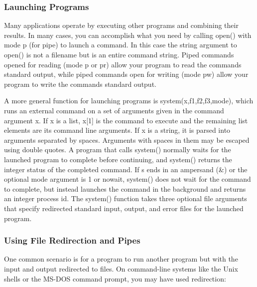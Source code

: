 \subsubsection[Launching Programs]{Launching Programs}

Many applications operate by executing other programs and combining
their results. In many cases, you can accomplish what you need by
calling \textsf{open()} with mode
\textsf{{\textquotedbl}p{\textquotedbl}} (for pipe) to
launch a command. In this case the string argument to \textsf{open()}
is not a filename but is an entire command string. Piped commands
opened for reading (mode \textsf{{\textquotedbl}p{\textquotedbl}} or
\textsf{{\textquotedbl}pr{\textquotedbl}}) allow your program to read
the command{\textquotesingle}s standard output, while piped commands
open for writing (mode \textsf{{\textquotedbl}pw{\textquotedbl}}) allow
your program to write the command{\textquotesingle}s standard output.

A more general function for launching programs is
\textsf{system(x,f1,f2,f3,mode)}, which runs an external command on a
set of arguments given in the command argument \textsf{x}. If
\textsf{x} is a list, \textsf{x[1]} is the command to execute and the
remaining list elements are its command line arguments. If \textsf{x}
is a string, it is parsed into arguments separated by spaces. Arguments
with spaces in them may be escaped using double quotes. A program that
calls \textsf{system()} normally waits for the launched
program to complete before continuing, and \textsf{system()} returns
the integer status of the completed command. If \textsf{s} ends in an
ampersand (\textsf{\&}) or the optional \textsf{mode} argument is
\textsf{1} or \textsf{{\textquotedbl}nowait{\textquotedbl}},
\textsf{system()} does not wait for the command to complete, but
instead launches the command in the background and returns an integer
process id. The \textsf{system()} function takes three optional file
arguments that specify redirected standard input, output, and error
files for the launched program.

\subsubsection[Using File Redirection and Pipes]{Using File Redirection
and Pipes}

One common scenario is for a program to run
another program but with the input and output redirected to files. On
command-line systems like the Unix shells or the MS-DOS command prompt,
you may have used redirection:

